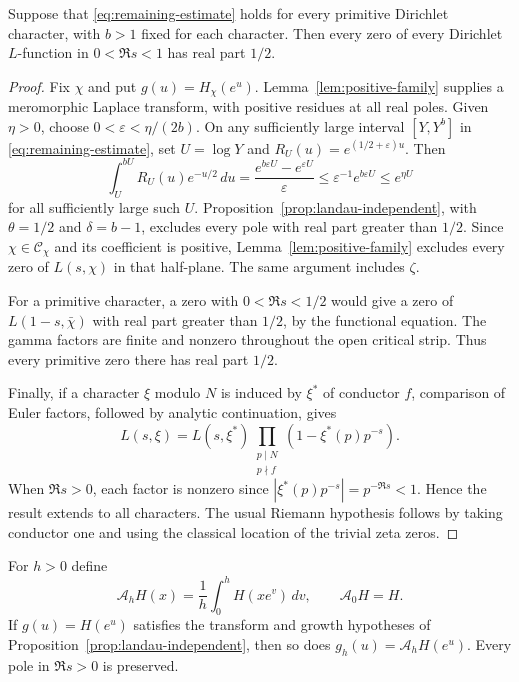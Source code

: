 \begin{theorem}\label{thm:interval-grh}
Suppose that \eqref{eq:remaining-estimate} holds for every primitive
Dirichlet character, with $b>1$ fixed for each character. Then every
zero of every Dirichlet $L$-function in $0<\Re s<1$ has real part
$1/2$.
\end{theorem}

\begin{proof}
Fix $\chi$ and put $g(u)=H_\chi(e^u)$. Lemma~\ref{lem:positive-family}
supplies a meromorphic Laplace transform, with positive residues at
all real poles. Given $\eta>0$, choose
$0<\varepsilon<\eta/(2b)$. On any sufficiently large interval
$[Y,Y^b]$ in \eqref{eq:remaining-estimate}, set $U=\log Y$ and
$R_U(u)=e^{(1/2+\varepsilon)u}$. Then
\[
 \int_U^{bU}R_U(u)e^{-u/2}\,du
    =\frac{e^{b\varepsilon U}-e^{\varepsilon U}}{\varepsilon}
    \le \varepsilon^{-1}e^{b\varepsilon U}
    \le e^{\eta U}
\]
for all sufficiently large such $U$. Proposition~\ref{prop:landau-independent},
with $\theta=1/2$ and $\delta=b-1$, excludes every pole with
real part greater than $1/2$. Since $\chi\in\mathcal C_\chi$ and its
coefficient is positive, Lemma~\ref{lem:positive-family} excludes
every zero of $L(s,\chi)$ in that half-plane. The same argument
includes $\zeta$.

For a primitive character, a zero with $0<\Re s<1/2$ would give a
zero of $L(1-s,\bar\chi)$ with real part greater than $1/2$, by the
functional equation. The gamma factors are finite and nonzero
throughout the open critical strip. Thus every primitive zero there
has real part $1/2$.

Finally, if a character $\xi$ modulo $N$ is induced by $\xi^*$ of
conductor $f$, comparison of Euler factors, followed by analytic
continuation, gives
\[
 L(s,\xi)=L(s,\xi^*)
       \prod_{\substack{p\mid N\\p\nmid f}}
                    (1-\xi^*(p)p^{-s}).
\]
When $\Re s>0$, each factor is nonzero since
$|\xi^*(p)p^{-s}|=p^{-\Re s}<1$. Hence the result extends to all
characters. The usual Riemann hypothesis follows by taking conductor
one and using the classical location of the trivial zeta zeros.
\end{proof}

\begin{lemma}\label{lem:logarithmic-averaging}
For $h>0$ define
\[
 \mathcal A_hH(x)=\frac1h\int_0^hH(xe^v)\,dv,
 \qquad \mathcal A_0H=H.
\]
If $g(u)=H(e^u)$ satisfies the transform and growth hypotheses of
Proposition~\ref{prop:landau-independent}, then so does
$g_h(u)=\mathcal A_hH(e^u)$. Every pole in $\Re s>0$ is preserved.
\end{lemma}

